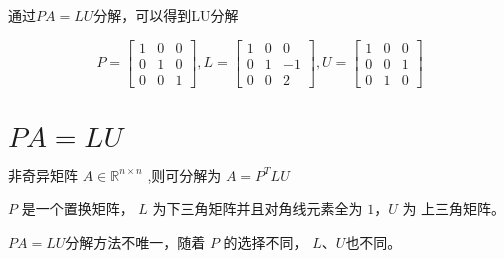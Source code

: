 \begin{example}
    通过$PA=LU$分解，可以得到LU分解

    $$P=\left[\begin{matrix}
        1 & 0 & 0\\
        0 & 1 & 0\\
        0 & 0 & 1
        \end{matrix}\right] ,L=\left[\begin{matrix}
        1 & 0 & 0\\
        0 & 1 & -1\\
        0 & 0 & 2
        \end{matrix}\right] ,U=\left[\begin{matrix}
        1 & 0 & 0\\
        0 & 0 & 1\\
        0 & 1 & 0
        \end{matrix}\right]$$
\end{example}

\section{\texorpdfstring{$PA=LU$}{PA=LU}}

\begin{theorem}
    非奇异矩阵 $ {A} \in \mathbb{R}^{n \times n} $ ,则可分解为 $ A=P^{T} L U $

    $ P $ 是一个置换矩阵， $ L $ 为下三角矩阵并且对角线元素全为 $ 1 ， U $ 为 上三角矩阵。
\end{theorem}


$PA=LU$分解方法不唯一，随着 $ P $ 的选择不同， $L$、$U$也不同。

